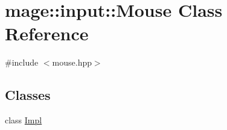 \hypertarget{classmage_1_1input_1_1_mouse}{}\section{mage\+:\+:input\+:\+:Mouse Class Reference}
\label{classmage_1_1input_1_1_mouse}


{\ttfamily \#include $<$mouse.\+hpp$>$}

\subsection*{Classes}
\begin{DoxyCompactItemize}
\item 
class \hyperlink{classmage_1_1input_1_1_mouse_1_1_impl}{Impl}
\end{DoxyCompactItemize}
